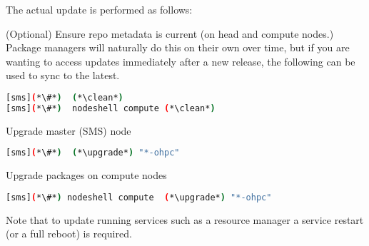 The actual update is performed as follows:
\begin{enumerate*}
\item (Optional) Ensure repo metadata is current (on head and compute nodes.)
  Package managers will naturally do this on their own over time,
  but if you are wanting to access updates immediately after a new release,
  the following can be used to sync to the latest.

\begin{lstlisting}[language=bash,keywords={}]
[sms](*\#*)  (*\clean*)
[sms](*\#*)  nodeshell compute (*\clean*)
\end{lstlisting}

\item Upgrade master (SMS) node

\begin{lstlisting}[language=bash,keywords={}]
[sms](*\#*)  (*\upgrade*) "*-ohpc"
\end{lstlisting}

\item Upgrade packages on compute nodes

\begin{lstlisting}[language=bash,keywords={}]
[sms](*\#*) nodeshell compute  (*\upgrade*) "*-ohpc"
\end{lstlisting}


\end{enumerate*}

\noindent Note that to update running services such as a resource manager a
service restart (or a full reboot) is required.

